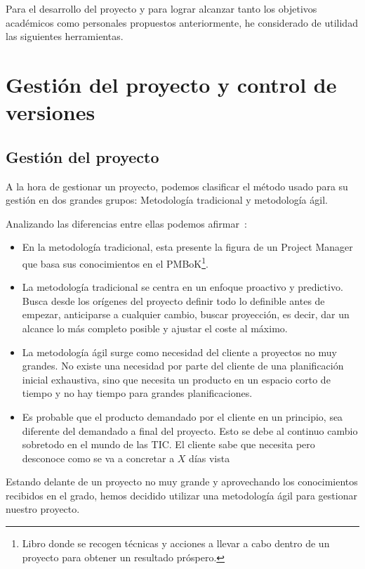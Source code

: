 
Para el desarrollo del proyecto y para lograr alcanzar tanto los objetivos académicos como personales propuestos anteriormente, he considerado de utilidad las siguientes herramientas.

\section{Gestión del proyecto y control de versiones}

\subsection{Gestión del proyecto}

A la hora de gestionar un proyecto, podemos clasificar el método usado para su gestión en dos grandes grupos: Metodología tradicional y metodología ágil.

Analizando las diferencias entre ellas podemos afirmar~\cite{web:diferencias-metodologias}:

\begin{itemize}
	\item En la metodología tradicional, esta presente la figura de un Project Manager que basa sus conocimientos en el PMBoK\footnote{Libro donde se recogen técnicas y acciones a llevar a cabo dentro de un proyecto para obtener un resultado próspero.}.
	\item La metodología tradicional se centra en un enfoque proactivo y predictivo. Busca desde los orígenes del proyecto definir todo lo definible antes de empezar, anticiparse a cualquier cambio, buscar proyección, es decir, dar un alcance lo más completo posible y ajustar el coste al máximo.
	
	\item La metodología ágil surge como necesidad del cliente a proyectos no muy grandes. No existe una necesidad por parte del cliente de una planificación inicial exhaustiva, sino que necesita un producto en un espacio corto de tiempo y no hay tiempo para grandes planificaciones.
	\item Es probable que el producto demandado por el cliente en un principio, sea diferente del demandado a final del proyecto. Esto se debe al continuo cambio sobretodo en el mundo de las TIC. El cliente sabe que necesita pero desconoce como se va a concretar a $X$ días vista
\end{itemize}

Estando delante de un proyecto no muy grande y aprovechando los conocimientos recibidos en el grado, hemos decidido utilizar una metodología ágil para gestionar nuestro proyecto.

